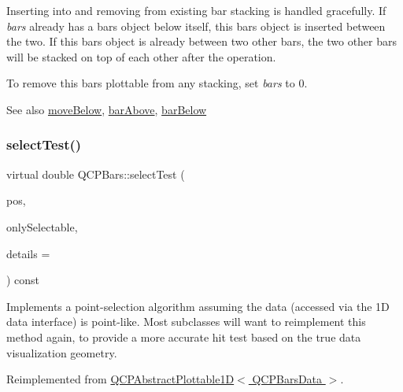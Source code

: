 Inserting into and removing from existing bar stacking is handled gracefully. If {\itshape bars} already has a bars object below itself, this bars object is inserted between the two. If this bars object is already between two other bars, the two other bars will be stacked on top of each other after the operation.

To remove this bars plottable from any stacking, set {\itshape bars} to 0.

\begin{DoxySeeAlso}{See also}
\hyperlink{class_q_c_p_bars_a69fc371346980f19177c3d1ecdad78ee}{move\+Below}, \hyperlink{class_q_c_p_bars_ab97f2acd9f6cb40d2cc3c33d278f0e78}{bar\+Above}, \hyperlink{class_q_c_p_bars_a1b58664864b141f45e02044a855b3213}{bar\+Below} 
\end{DoxySeeAlso}
\mbox{\label{class_q_c_p_bars_a7b282a2932c7c0b4a45bd61e8c490153}} 
\subsubsection{\texorpdfstring{select\+Test()}{selectTest()}\hspace{0.1cm}{\footnotesize\ttfamily [1/2]}}
{\footnotesize\ttfamily virtual double Q\+C\+P\+Bars\+::select\+Test (\begin{DoxyParamCaption}\item[{const Q\+PointF \&}]{pos,  }\item[{bool}]{only\+Selectable,  }\item[{Q\+Variant $\ast$}]{details = {} }\end{DoxyParamCaption}) const\hspace{0.3cm}{\ttfamily [virtual]}}

Implements a point-\/selection algorithm assuming the data (accessed via the 1D data interface) is point-\/like. Most subclasses will want to reimplement this method again, to provide a more accurate hit test based on the true data visualization geometry.

Reimplemented from \hyperlink{class_q_c_p_abstract_plottable1_d_a071e2df66ba1746067dfcb5e27947b43}{Q\+C\+P\+Abstract\+Plottable1\+D$<$ Q\+C\+P\+Bars\+Data $>$}.

\mbox{\label{class_q_c_p_bars_a121f899c27af3186fe93dcd0eb98f49b}} 
